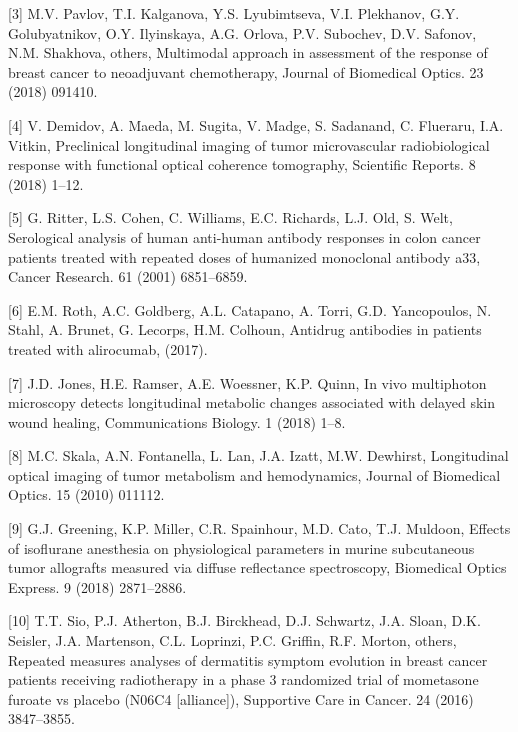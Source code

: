 \documentclass[
]{article}
\begin{document}
\leavevmode\hypertarget{ref-pavlov2018}{}%
{[}3{]} M.V. Pavlov, T.I. Kalganova, Y.S. Lyubimtseva, V.I. Plekhanov, G.Y. Golubyatnikov, O.Y. Ilyinskaya, A.G. Orlova, P.V. Subochev, D.V. Safonov, N.M. Shakhova, others, Multimodal approach in assessment of the response of breast cancer to neoadjuvant chemotherapy, Journal of Biomedical Optics. 23 (2018) 091410.

\leavevmode\hypertarget{ref-demidov2018}{}%
{[}4{]} V. Demidov, A. Maeda, M. Sugita, V. Madge, S. Sadanand, C. Flueraru, I.A. Vitkin, Preclinical longitudinal imaging of tumor microvascular radiobiological response with functional optical coherence tomography, Scientific Reports. 8 (2018) 1--12.

\leavevmode\hypertarget{ref-ritter2001}{}%
{[}5{]} G. Ritter, L.S. Cohen, C. Williams, E.C. Richards, L.J. Old, S. Welt, Serological analysis of human anti-human antibody responses in colon cancer patients treated with repeated doses of humanized monoclonal antibody a33, Cancer Research. 61 (2001) 6851--6859.

\leavevmode\hypertarget{ref-roth2017}{}%
{[}6{]} E.M. Roth, A.C. Goldberg, A.L. Catapano, A. Torri, G.D. Yancopoulos, N. Stahl, A. Brunet, G. Lecorps, H.M. Colhoun, Antidrug antibodies in patients treated with alirocumab, (2017).

\leavevmode\hypertarget{ref-jones2018}{}%
{[}7{]} J.D. Jones, H.E. Ramser, A.E. Woessner, K.P. Quinn, In vivo multiphoton microscopy detects longitudinal metabolic changes associated with delayed skin wound healing, Communications Biology. 1 (2018) 1--8.

\leavevmode\hypertarget{ref-skala2010}{}%
{[}8{]} M.C. Skala, A.N. Fontanella, L. Lan, J.A. Izatt, M.W. Dewhirst, Longitudinal optical imaging of tumor metabolism and hemodynamics, Journal of Biomedical Optics. 15 (2010) 011112.

\leavevmode\hypertarget{ref-greening2018}{}%
{[}9{]} G.J. Greening, K.P. Miller, C.R. Spainhour, M.D. Cato, T.J. Muldoon, Effects of isoflurane anesthesia on physiological parameters in murine subcutaneous tumor allografts measured via diffuse reflectance spectroscopy, Biomedical Optics Express. 9 (2018) 2871--2886.

\leavevmode\hypertarget{ref-sio2016}{}%
{[}10{]} T.T. Sio, P.J. Atherton, B.J. Birckhead, D.J. Schwartz, J.A. Sloan, D.K. Seisler, J.A. Martenson, C.L. Loprinzi, P.C. Griffin, R.F. Morton, others, Repeated measures analyses of dermatitis symptom evolution in breast cancer patients receiving radiotherapy in a phase 3 randomized trial of mometasone furoate vs placebo (N06C4 {[}alliance{]}), Supportive Care in Cancer. 24 (2016) 3847--3855.
\end{document}
